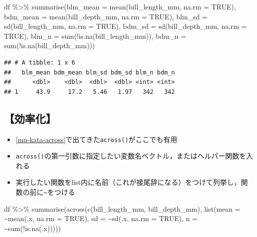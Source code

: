 \documentclass[
  xelatex,ja=standard, b5paper]{bxjsbook}
\newenvironment{Shaded}{\begin{snugshade}}{\end{snugshade}}
\newcommand{\AttributeTok}[1]{\textcolor[rgb]{0.77,0.63,0.00}{#1}}
\newcommand{\ConstantTok}[1]{\textcolor[rgb]{0.00,0.00,0.00}{#1}}
\newcommand{\FunctionTok}[1]{\textcolor[rgb]{0.00,0.00,0.00}{#1}}
\newcommand{\NormalTok}[1]{#1}
\newcommand{\SpecialCharTok}[1]{\textcolor[rgb]{0.00,0.00,0.00}{#1}}
\providecommand{\tightlist}{%
  \setlength{\itemsep}{0pt}\setlength{\parskip}{0pt}}
\begin{document}
\begin{Shaded}
\begin{Highlighting}[]
\NormalTok{df }\SpecialCharTok{\%\textgreater{}\%} 
  \FunctionTok{summarise}\NormalTok{(}\AttributeTok{blm\_mean =} \FunctionTok{mean}\NormalTok{(bill\_length\_mm, }\AttributeTok{na.rm =} \ConstantTok{TRUE}\NormalTok{),}
            \AttributeTok{bdm\_mean =} \FunctionTok{mean}\NormalTok{(bill\_depth\_mm, }\AttributeTok{na.rm =} \ConstantTok{TRUE}\NormalTok{),}
            \AttributeTok{blm\_sd =} \FunctionTok{sd}\NormalTok{(bill\_length\_mm, }\AttributeTok{na.rm =} \ConstantTok{TRUE}\NormalTok{),}
            \AttributeTok{bdm\_sd =} \FunctionTok{sd}\NormalTok{(bill\_depth\_mm, }\AttributeTok{na.rm =} \ConstantTok{TRUE}\NormalTok{),}
            \AttributeTok{blm\_n  =} \FunctionTok{sum}\NormalTok{(}\SpecialCharTok{!}\FunctionTok{is.na}\NormalTok{(bill\_length\_mm)),}
            \AttributeTok{bdm\_n  =} \FunctionTok{sum}\NormalTok{(}\SpecialCharTok{!}\FunctionTok{is.na}\NormalTok{(bill\_depth\_mm)))}
\end{Highlighting}
\end{Shaded}

\begin{verbatim}
## # A tibble: 1 x 6
##   blm_mean bdm_mean blm_sd bdm_sd blm_n bdm_n
##      <dbl>    <dbl>  <dbl>  <dbl> <int> <int>
## 1     43.9     17.2   5.46   1.97   342   342
\end{verbatim}

\hypertarget{su-st-ef}{%
\subsection{【効率化】}\label{su-st-ef}}

\begin{itemize}
\tightlist
\item
  \ref{mu-kata-across}で出てきた\texttt{across()}がここでも有用
\item
  \texttt{across()}の第一引数に指定したい変数名ベクトル，またはヘルパー関数を入れる
\item
  実行したい関数をlist内に名前（これが接尾辞になる）をつけて列挙し，関数の前に\texttt{\textasciitilde{}}をつける
\end{itemize}

\begin{Shaded}
\begin{Highlighting}[]
\NormalTok{df }\SpecialCharTok{\%\textgreater{}\%} 
  \FunctionTok{summarise}\NormalTok{(}\FunctionTok{across}\NormalTok{(}\FunctionTok{c}\NormalTok{(bill\_length\_mm, bill\_depth\_mm),}
                   \FunctionTok{list}\NormalTok{(}\AttributeTok{mean =} \SpecialCharTok{\textasciitilde{}}\FunctionTok{mean}\NormalTok{(.x, }\AttributeTok{na.rm =} \ConstantTok{TRUE}\NormalTok{),}
                        \AttributeTok{sd =} \SpecialCharTok{\textasciitilde{}}\FunctionTok{sd}\NormalTok{(.x, }\AttributeTok{na.rm =} \ConstantTok{TRUE}\NormalTok{),}
                        \AttributeTok{n =} \SpecialCharTok{\textasciitilde{}}\FunctionTok{sum}\NormalTok{(}\SpecialCharTok{!}\FunctionTok{is.na}\NormalTok{(.x)))))}
\end{Highlighting}
\end{Shaded}
\end{document}
